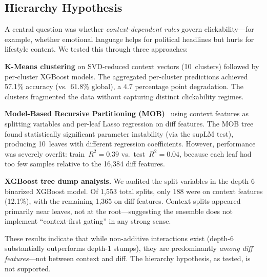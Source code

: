 \documentclass[sigconf,natbib=false, language=english]{acmart}
\begin{document}
\subsection{Hierarchy Hypothesis}

A central question was whether \emph{context-dependent rules} govern clickability---for example, whether emotional language helps for political headlines but hurts for lifestyle content. We tested this through three approaches:

\textbf{K-Means clustering} on SVD-reduced context vectors (10~clusters) followed by per-cluster XGBoost models. The aggregated per-cluster predictions achieved 57.1\% accuracy (vs.\ 61.8\% global), a 4.7 percentage point degradation. The clusters fragmented the data without capturing distinct clickability regimes.

\textbf{Model-Based Recursive Partitioning (MOB)}~\cite{zeileis2008mob} using context features as splitting variables and per-leaf Lasso regression on diff features. The MOB tree found statistically significant parameter instability (via the supLM test), producing 10~leaves with different regression coefficients. However, performance was severely overfit: train~$R^2 = 0.39$ vs.\ test~$R^2 = 0.04$, because each leaf had too few samples relative to the 16,384 diff features.

\textbf{XGBoost tree dump analysis.} We audited the split variables in the depth-6 binarized XGBoost model. Of 1,553 total splits, only 188 were on context features (12.1\%), with the remaining 1,365 on diff features. Context splits appeared primarily near leaves, not at the root---suggesting the ensemble does not implement ``context-first gating'' in any strong sense.

These results indicate that while non-additive interactions exist (depth-6 substantially outperforms depth-1 stumps), they are predominantly \emph{among diff features}---not between context and diff. The hierarchy hypothesis, as tested, is not supported.
\end{document}
